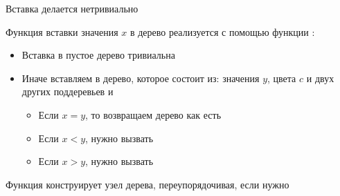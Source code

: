 \begin{frame}{Вставка делается нетривиально}

Функция  вставки значения $x$ в дерево реализуется с помощью функции 
:
\begin{itemize}
\item Вставка в пустое дерево тривиальна
\item Иначе вставляем в  дерево, которое состоит из: значения $y$, цвета $c$ и двух других поддеревьев  и 
\begin{itemize}
\item Если $x=y$, то возвращаем дерево как есть
\item Если $x<y$, нужно вызвать  
\item Если $x>y$, нужно вызвать  
\end{itemize}
\end{itemize}
\vspace{2em}
Функция  конструирует узел дерева, переупорядочивая, если нужно
\end{frame}


%
%
%


